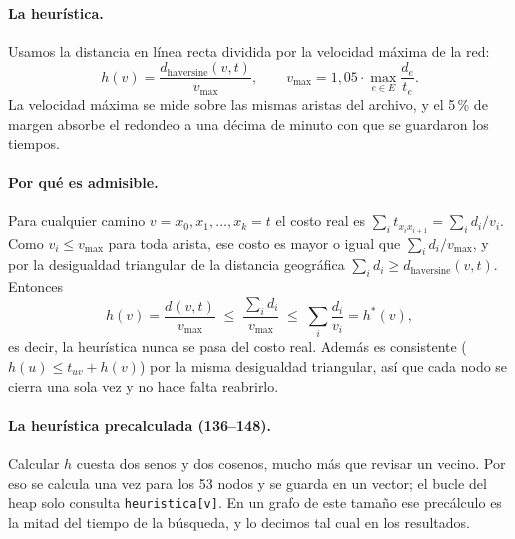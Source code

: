 \documentclass[11pt,a4paper]{article}
\newcommand{\arch}[1]{\texttt{#1}}
\begin{document}
\paragraph{La heurística.}
Usamos la distancia en línea recta dividida por la velocidad máxima de la red:
\begin{equation}
  h(v) = \frac{d_{\text{haversine}}(v, t)}{v_{\max}}, \qquad
  v_{\max} = 1{,}05 \cdot \max_{e \in E} \frac{d_e}{t_e}.
  \label{eq:heuristica}
\end{equation}
La velocidad máxima se mide sobre las mismas aristas del archivo, y el 5\,\% de
margen absorbe el redondeo a una décima de minuto con que se guardaron los
tiempos.

\paragraph{Por qué es admisible.}
Para cualquier camino $v = x_0, x_1, \dots, x_k = t$ el costo real es
$\sum_i t_{x_i x_{i+1}} = \sum_i d_i / v_i$. Como $v_i \leq v_{\max}$ para toda
arista, ese costo es mayor o igual que $\sum_i d_i / v_{\max}$, y por la desigualdad
triangular de la distancia geográfica $\sum_i d_i \geq d_{\text{haversine}}(v,t)$.
Entonces
\begin{equation}
  h(v) = \frac{d(v,t)}{v_{\max}} \;\leq\; \frac{\sum_i d_i}{v_{\max}}
       \;\leq\; \sum_i \frac{d_i}{v_i} = h^*(v),
\end{equation}
es decir, la heurística nunca se pasa del costo real. Además es consistente
($h(u) \leq t_{uv} + h(v)$) por la misma desigualdad triangular, así que cada nodo
se cierra una sola vez y no hace falta reabrirlo.



\paragraph{La heurística precalculada (136--148).}
Calcular $h$ cuesta dos senos y dos cosenos, mucho más que revisar un vecino. Por
eso se calcula una vez para los 53 nodos y se guarda en un vector; el bucle del
heap solo consulta \arch{heuristica[v]}. En un grafo de este tamaño ese
precálculo es la mitad del tiempo de la búsqueda, y lo decimos tal cual en los
resultados.
\end{document}
